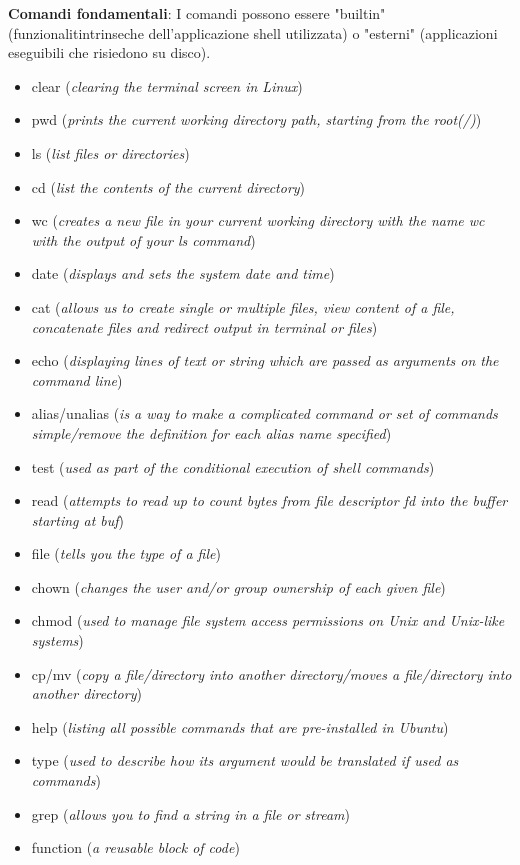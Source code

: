 \begin{flushleft}
  \textbf{Comandi fondamentali}: I comandi possono essere "builtin" (funzionalit\aca intrinseche dell'applicazione 
  shell utilizzata) o "esterni" (applicazioni eseguibili che risiedono su disco).
  \begin{itemize}
    \item clear (\textit{clearing the terminal screen in Linux})
    \item pwd (\textit{prints the current working directory path, starting from the root(/)})
    \item ls  (\textit{list files or directories})
    \item cd (\textit{list the contents of the current directory})
    \item wc (\textit{creates a new file in your current working directory with the name wc with the output of your ls command})
    \item date (\textit{displays and sets the system date and time})
    \item cat (\textit{allows us to create single or multiple files, view content of a file, concatenate files and redirect output in terminal or files})
    \item echo (\textit{displaying lines of text or string which are passed as arguments on the command line})
    \item alias/unalias (\textit{is a way to make a complicated command or set of commands simple/remove the definition for each alias name specified})
    \item test (\textit{used as part of the conditional execution of shell commands})
    \item read (\textit{attempts to read up to count bytes from file descriptor fd into the buffer starting at buf})
    \item file (\textit{tells you the type of a file})
    \item chown (\textit{changes the user and/or group ownership of each given file})
    \item chmod (\textit{used to manage file system access permissions on Unix and Unix-like systems})
    \item cp/mv (\textit{copy a file/directory into another directory/moves a file/directory into another directory})
    \item help (\textit{listing all possible commands that are pre-installed in Ubuntu})
    \item type (\textit{used to describe how its argument would be translated if used as commands})
    \item grep (\textit{allows you to find a string in a file or stream})
    \item function (\textit{a reusable block of code})
  \end{itemize}
\end{flushleft}
